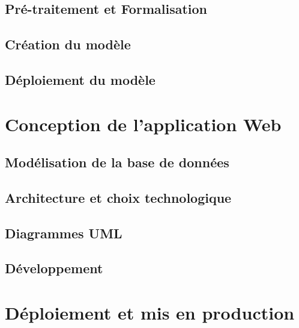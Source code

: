\subsection{Pré-traitement et Formalisation}
\subsection{Création du modèle}
\subsection{Déploiement du modèle}

\section{Conception de l'application Web}
\subsection{Modélisation de la base de données}
\subsection{Architecture et choix technologique}
\subsection{Diagrammes UML}
\subsection{Développement}

\section{Déploiement et mis en production}
